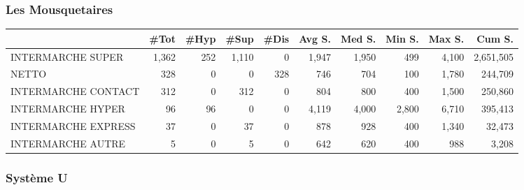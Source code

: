 \documentclass[11pt]{article}
\begin{document}
\subsubsection{Les Mousquetaires}

\begin{table}[H]
\footnotesize
\setlength{\tabcolsep}{2pt}

\begin{tabular}{lrrrrrrrrr}
\toprule
{} &       \#Tot &       \#Hyp &       \#Sup &       \#Dis &     Avg S. &     Med S. &     Min S. &     Max S. &     Cum S. \\
\midrule
INTERMARCHE SUPER   &      1,362 &        252 &      1,110 &          0 &      1,947 &      1,950 &        499 &      4,100 &  2,651,505 \\
NETTO               &        328 &          0 &          0 &        328 &        746 &        704 &        100 &      1,780 &    244,709 \\
INTERMARCHE CONTACT &        312 &          0 &        312 &          0 &        804 &        800 &        400 &      1,500 &    250,860 \\
INTERMARCHE HYPER   &         96 &         96 &          0 &          0 &      4,119 &      4,000 &      2,800 &      6,710 &    395,413 \\
INTERMARCHE EXPRESS &         37 &          0 &         37 &          0 &        878 &        928 &        400 &      1,340 &     32,473 \\
INTERMARCHE AUTRE   &          5 &          0 &          5 &          0 &        642 &        620 &        400 &        988 &      3,208 \\
\bottomrule
\end{tabular}

\end{table}

\subsubsection{Système U}
\end{document}
